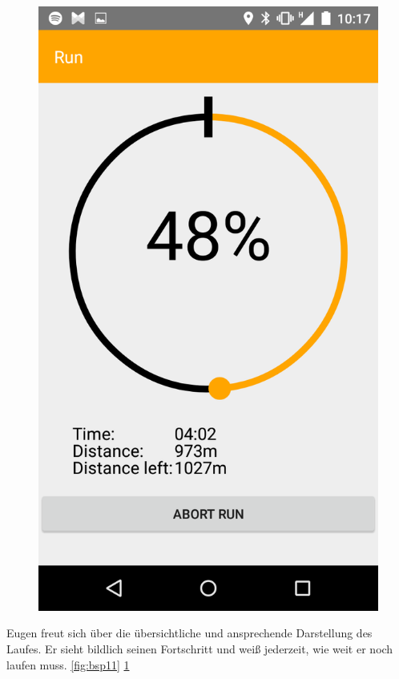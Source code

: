 \begin{figure}
\begin{minipage}{.4\textwidth}
  \includegraphics[width=.8\linewidth]{abb/bsp/bsp12}
  \label{fig:bsp12}
\end{minipage}
\end{figure}

Eugen freut sich über die übersichtliche und ansprechende Darstellung des Laufes. Er sieht bildlich seinen Fortschritt und weiß jederzeit, wie weit er noch laufen muss. \ref{fig:bsp11} \ref{fig:bsp12}

